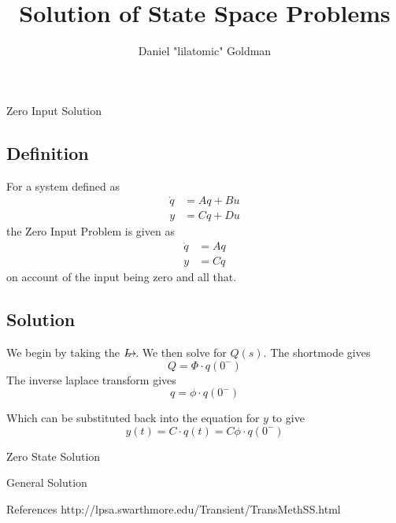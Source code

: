 \documentclass{../templates/topic}
\title{Solution of State Space Problems}
\author{Daniel "lilatomic" Goldman}
\begin{document}
\maketitle

\begin{section}{Zero Input Solution}
	
	\subsection{Definition}
	
		For a system defined as
		\begin{align}
			\dot{q}&=Aq+Bu \\
			y&= Cq+Du
		\end{align}
		the Zero Input Problem is given as
		\begin{align}
			\dot{q}&=Aq \\
			y&= Cq
		\end{align}
		on account of the input being zero and all that.
		
	\subsection{Solution}
		We begin by taking the $\laplace$.
		We then solve for $Q(s)$. The shortmode gives
		\begin{equation}
			Q=\Phi\cdot q(0^-)
		\end{equation}
		The inverse laplace transform gives
		\begin{equation}
			q=\phi\cdot q(0^-)
		\end{equation}
		
		Which can be substituted back into the equation for $y$ to give
		\begin{equation}
			y(t)=C\cdot q(t)=C\phi\cdot q(0^-)
		\end{equation}
	
\end{section}

\begin{section}{Zero State Solution}
	
\end{section}

\begin{section}{General Solution}
	
\end{section}

\begin{section}{References}
	http://lpsa.swarthmore.edu/Transient/TransMethSS.html
\end{section}
\end{document}
